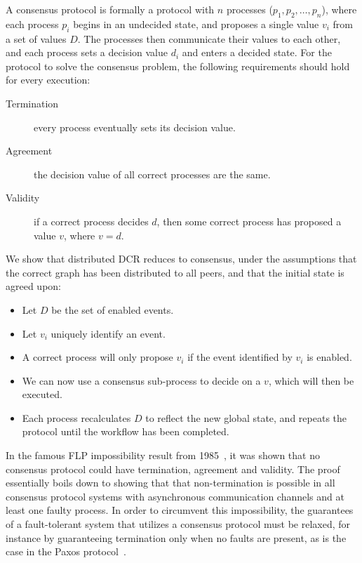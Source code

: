 \documentclass{article}
\begin{document}
		A consensus protocol is formally a protocol with $n$ processes ($p_1, p_2, \dots, p_{n}$), where each process $p_i$ begins in an undecided state, and proposes a single value $v_i$ from a set of values $D$. The processes then communicate their values to each other, and each process sets a decision value $d_i$ and enters a decided state.
		For the protocol to solve the consensus problem, the following requirements should hold for every execution:
		\begin{description}
			\item[Termination] every process eventually sets its decision value.
			\item[Agreement] the decision value of all correct processes are the same.
			\item[Validity] if a correct process decides $d$, then some correct process has proposed a value $v$, where $v = d$.
		\end{description}

		We show that distributed DCR reduces to consensus, under the assumptions that the correct graph has been distributed to all peers, and that the initial state is agreed upon:
		\begin{itemize}
			\item Let $D$ be the set of enabled events.
			\item Let $v_i$ uniquely identify an event.
			\item A correct process will only propose $v_i$ if the event identified by $v_i$ is enabled.
			\item We can now use a consensus sub-process to decide on a $v$, which will then be executed.
			\item Each process recalculates $D$ to reflect the new global state, and repeats the protocol until the workflow has been completed.
		\end{itemize}

		In the famous FLP impossibility result from 1985~\cite{fischer_impossibility_1985}, it was shown that no consensus protocol could have termination, agreement and validity.
		The proof essentially boils down to showing that that non-termination is possible in all consensus protocol systems with asynchronous communication channels and at least one faulty process.
		In order to circumvent this impossibility, the guarantees of a fault-tolerant system that utilizes a consensus protocol must be relaxed, for instance by guaranteeing termination only when no faults are present, as is the case in the Paxos protocol~\cite{lamport_part-time_1998}.
\end{document}
